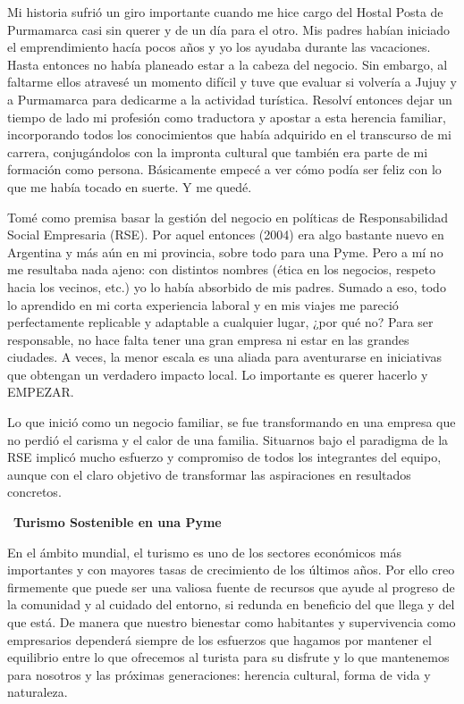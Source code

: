 \begin{fullwidth}
Mi historia sufrió un giro importante cuando me hice cargo del Hostal
Posta de Purmamarca casi sin querer y de un día para el otro. Mis padres
habían iniciado el emprendimiento hacía pocos años y yo los ayudaba
durante las vacaciones. Hasta entonces no había planeado estar a la
cabeza del negocio. Sin embargo, al faltarme ellos atravesé un momento
difícil y tuve que evaluar si volvería a Jujuy y a Purmamarca para
dedicarme a la actividad turística. Resolví entonces dejar un tiempo de
lado mi profesión como traductora y apostar a esta herencia familiar,
incorporando todos los conocimientos que había adquirido en el
transcurso de mi carrera, conjugándolos con la impronta cultural que
también era parte de mi formación como persona. Básicamente empecé a ver
cómo podía ser feliz con lo que me había tocado en suerte. Y me quedé.

Tomé como premisa basar la gestión del negocio en políticas de
Responsabilidad Social Empresaria (RSE). Por aquel entonces (2004) era
algo bastante nuevo en Argentina y más aún en mi provincia, sobre todo
para una Pyme. Pero a mí no me resultaba nada ajeno: con distintos
nombres (ética en los negocios, respeto hacia los vecinos, etc.) yo lo
había absorbido de mis padres. Sumado a eso, todo lo aprendido en mi
corta experiencia laboral y en mis viajes me pareció perfectamente
replicable y adaptable a cualquier lugar, ¿por qué no? Para ser
responsable, no hace falta tener una gran empresa ni estar en las
grandes ciudades. A veces, la menor escala es una aliada para
aventurarse en iniciativas que obtengan un verdadero impacto local. Lo
importante es querer hacerlo y EMPEZAR.

Lo que inició como un negocio familiar, se fue transformando en una
empresa que no perdió el carisma y el calor de una familia. Situarnos
bajo el paradigma de la RSE implicó mucho esfuerzo y compromiso de todos
los integrantes del equipo, aunque con el claro objetivo de transformar
las aspiraciones en resultados concretos.

~\textbf{Turismo Sostenible en una Pyme}

En el ámbito mundial, el turismo es uno de los sectores económicos más
importantes y con mayores tasas de crecimiento de los últimos años. Por
ello creo firmemente que puede ser una valiosa fuente de recursos que
ayude al progreso de la comunidad y al cuidado del entorno, si redunda
en beneficio del que llega y del que está. De manera que nuestro
bienestar como habitantes y supervivencia como empresarios dependerá
siempre de los esfuerzos que hagamos por mantener el equilibrio entre lo
que ofrecemos al turista para su disfrute y lo que mantenemos para
nosotros y las próximas generaciones: herencia cultural, forma de vida y
naturaleza.


\end{fullwidth}
